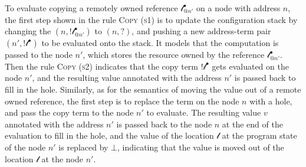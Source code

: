 To evaluate copying a remotely owned reference $\mathscr{l}^\bullet_{@n'}$ on a node with address $n$, the first step shown in the rule \textsc{Copy (s1)} is to update the configuration stack by changing the $(n, !\mathscr{l}^\bullet_{@n'})$ to $(n, ?)$, and pushing a new address-term pair $(n', !\mathscr{l}^\bullet)$ to be evaluated onto the stack. It models that the computation is passed to the node $n'$, which stores the resource owned by the reference $\mathscr{l}^\bullet_{@n'}$. Then the rule \textsc{Copy (s2)} indicates that the copy term $!\mathscr{l}^\bullet$ gets evaluated on the node $n'$, and the resulting value annotated with the address $n'$ is passed back to fill in the hole. Similarly, as for the semantics of moving the value out of a remote owned reference, the first step is to replace the term on the node $n$ with a hole, and pass the copy term to the node $n'$ to evaluate. The resulting value $v$ annotated with the address $n'$ is passed back to the node $n$ at the end of the evaluation to fill in the hole, and the value of the location $\mathscr{l}$ at the program state of the node $n'$ is replaced by $\bot$, indicating that the value is moved out of the location $\mathscr{l}$ at the node $n'$.

